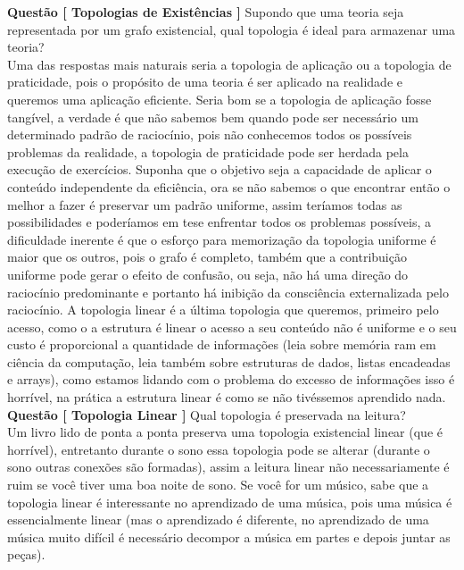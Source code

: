 \documentclass[10pt,a4paper]{report}
\begin{document}
\textbf{Questão [ Topologias de Existências ]} Supondo que uma teoria seja representada por um grafo existencial, qual topologia é ideal para armazenar uma teoria?\\

Uma das respostas mais naturais seria a topologia de aplicação ou a topologia de praticidade, pois o propósito de uma teoria é ser aplicado na realidade e queremos uma aplicação eficiente. Seria bom se a topologia de aplicação fosse tangível, a verdade é que não sabemos bem quando pode ser necessário um determinado padrão de raciocínio, pois não conhecemos todos os possíveis problemas da realidade, a topologia de praticidade pode ser herdada pela execução de exercícios. Suponha que o objetivo seja a capacidade de aplicar o conteúdo independente da eficiência, ora se não sabemos o que encontrar então o melhor a fazer é preservar um padrão uniforme, assim teríamos todas as possibilidades e poderíamos em tese enfrentar todos os problemas possíveis, a dificuldade inerente é que o esforço para memorização da topologia uniforme é maior que os outros, pois o grafo é completo, também que a contribuição uniforme pode gerar o efeito de confusão, ou seja, não há uma direção do raciocínio predominante e portanto há inibição da consciência externalizada pelo raciocínio. A topologia linear é a última topologia que queremos, primeiro pelo acesso, como o a estrutura é linear o acesso a seu conteúdo não é uniforme e o seu custo é proporcional a quantidade de informações (leia sobre memória ram em ciência da computação, leia também sobre estruturas de dados, listas encadeadas e arrays), como estamos lidando com o problema do excesso de informações isso é horrível, na prática a estrutura linear é como se não tivéssemos aprendido nada.\\

\textbf{Questão [ Topologia Linear ]} Qual topologia é preservada na leitura?\\

Um livro lido de ponta a ponta preserva uma topologia existencial linear (que é horrível), entretanto durante o sono essa topologia pode se alterar (durante o sono outras conexões são formadas), assim a leitura linear não necessariamente é ruim se você tiver uma boa noite de sono. Se você for um músico, sabe que a topologia linear é interessante no aprendizado de uma música, pois uma música é essencialmente linear (mas o aprendizado é diferente, no aprendizado de uma música muito difícil é necessário decompor a música em partes e depois juntar as peças).\\
\end{document}
